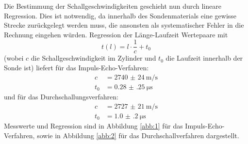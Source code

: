 Die Bestimmung der Schallgeschwindigkeiten geschieht nun durch lineare Regression.
Dies ist notwendig, da innerhalb des Sondenmaterials eine gewisse Strecke zurückgelegt werden
muss, die ansonsten als systematischer Fehler in die Rechnung eingehen würden.
Regression der Länge-Laufzeit Wertepaare mit
\begin{equation}
  t(l) = l \cdot \frac{1}{c} + t_0
\end{equation}
(wobei $c$ die Schallgeschwindigkeit im Zylinder und $t_0$ die Laufzeit innerhalb der
Sonde ist) liefert für das Impuls-Echo-Verfahren:
\begin{align*}
  c &= \SI[per-mode=reciprocal]{2740(24)}{\metre\per\second}\\
  t_0 &= \SI{0.28(25)}{\micro\second}
\end{align*}
und für das Durchschallungsverfahren:
\begin{align*}
  c &= \SI[per-mode=reciprocal]{2727(21)}{\metre\per\second}\\
  t_0 &= \SI{1.0(2)}{\micro\second}
\end{align*}
Messwerte und Regression sind in Abbildung \ref{abb:1} für das Impuls-Echo-Verfahren,
sowie in Abbildung \ref{abb:2} für das Durchschallverfahren dargestellt.
